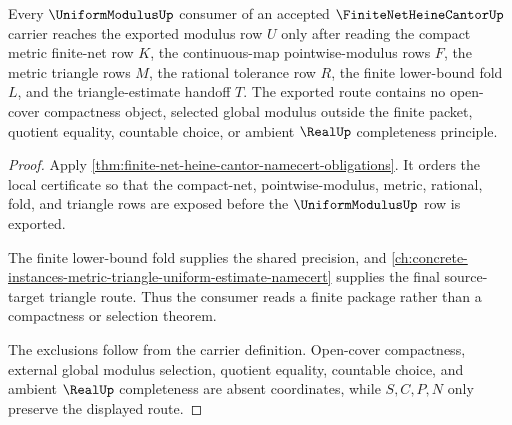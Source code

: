 \begin{theorem}
\label{thm:finite-net-heine-cantor-uniform-modulus-route}
Every $\UniformModulusUp$ consumer of an accepted $\FiniteNetHeineCantorUp$ carrier reaches the exported modulus row $U$ only after reading the compact metric finite-net row $K$, the continuous-map pointwise-modulus rows $F$, the metric triangle rows $M$, the rational tolerance row $R$, the finite lower-bound fold $L$, and the triangle-estimate handoff $T$. The exported route contains no open-cover compactness object, selected global modulus outside the finite packet, quotient equality, countable choice, or ambient $\RealUp$ completeness principle.
\end{theorem}
\begin{proof}
Apply \autoref{thm:finite-net-heine-cantor-namecert-obligations}. It orders the local certificate so that the compact-net, pointwise-modulus, metric, rational, fold, and triangle rows are exposed before the $\UniformModulusUp$ row is exported.

The finite lower-bound fold supplies the shared precision, and \autoref{ch:concrete-instances-metric-triangle-uniform-estimate-namecert} supplies the final source-target triangle route. Thus the consumer reads a finite package rather than a compactness or selection theorem.

The exclusions follow from the carrier definition. Open-cover compactness, external global modulus selection, quotient equality, countable choice, and ambient $\RealUp$ completeness are absent coordinates, while $S,C,P,N$ only preserve the displayed route.
\end{proof}





